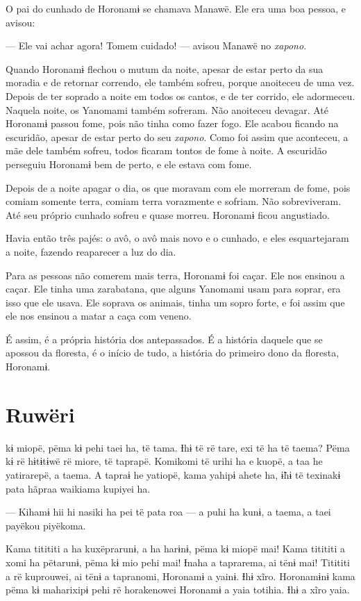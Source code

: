 O pai do cunhado de Horonamɨ se chamava Manawë. Ele era uma boa pessoa,
e avisou: 

 --- Ele vai achar agora! Tomem cuidado! --- avisou Manawë no \textit{xapono}. 

Quando Horonamɨ flechou o mutum da noite, apesar de estar perto da sua
moradia e de retornar correndo, ele também sofreu, porque anoiteceu
de uma vez. Depois de ter soprado a noite em todos os cantos, e de ter
corrido, ele adormeceu. Naquela noite, os Yanomami também sofreram. Não
anoiteceu devagar. Até Horonamɨ passou fome, pois não tinha como fazer
fogo. Ele acabou ficando na escuridão, apesar de estar perto do seu
\textit{xapono}. Como foi assim que aconteceu, a mãe dele também sofreu, todos
ficaram tontos de fome à noite. A escuridão perseguiu Horonamɨ bem de
perto, e ele estava com fome. 

Depois de a noite apagar o dia, os que moravam com ele morreram de
fome, pois comiam somente terra, comiam terra vorazmente e sofriam. Não
sobreviveram. Até seu próprio cunhado sofreu e quase morreu. Horonamɨ
ficou angustiado.

Havia então três pajés: o avô, o avô mais novo e o cunhado, e eles
esquartejaram a noite, fazendo reaparecer a luz do dia. 

Para as pessoas não comerem mais terra, Horonamɨ foi caçar. Ele nos
ensinou a caçar. Ele tinha uma zarabatana, que alguns Yanomami usam para
soprar, era isso que ele usava. Ele soprava os animais, tinha um sopro
forte, e foi assim que ele nos ensinou a matar a caça com veneno. 

 É assim, é a própria história dos antepassados. É a história
daquele que se apossou da floresta, é o início de tudo, a história do
primeiro dono da floresta, Horonamɨ.

\chapter{Ruwëri}

 kɨ miopë, pëma kɨ pehi taei ha, të tama. Ɨhɨ të rë tare, exi të ha
të taema? Pëma kɨ rë hɨtɨtɨwë rë miore, të taprapë. Komikomi të urihi ha
e kuopë, a taa he yatirarepë, a taema. A tapraɨ he yatiopë, kama yahipɨ
ahete ha, ɨ̃hɨ të texinakɨ pata hãpraa waikiama kupiyei ha. 

--- Kihamɨ hii hi nasiki ha pei të pata roa --- a puhi ha kunɨ, a taema, a
taei payëkou piyëkoma. 

Kama titititi a ha kuxëprarunɨ, a ha harɨnɨ, pëma kɨ miopë mai! Kama
titititi a xomi ha pëtarunɨ, pëma kɨ mio pehi mai! Ɨnaha a taprarema, ai
tënɨ mai! Titititi a rë kuprouwei, ai tënɨ a tapranomi, Horonamɨ a
yainɨ. Ɨhɨ xĩro. Horonamɨnɨ kama pëma kɨ maharixipɨ pehi rë horakenowei
Horonamɨ a yaia totihia. Ɨhɨ a xĩro yaia. 

